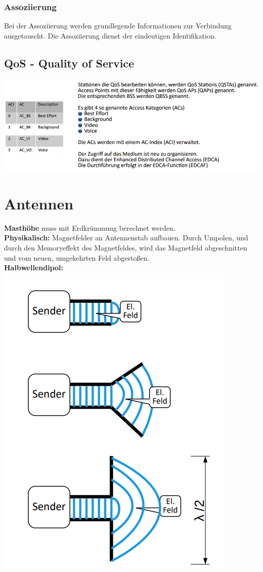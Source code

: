 \documentclass[12pt,a4paper]{article}
\begin{document}
		\subsubsection{Assoziierung}
			Bei der Assoziierung werden grundlegende Informationen zur Verbindung ausgetauscht. Die Assoziierung dienst der eindeutigen Identifikation.
	
	\subsection{QoS - Quality of Service}
	\includegraphics[width=\textwidth]{Bilder/QoS-removedBg.png}

\section{Antennen}
	\textbf{Masthöhe} muss mit Erdkrümmung berechnet werden.\\
	\textbf{Physikalisch:} Magnetfelder an Antennenstab aufbauen. 
	Durch Umpolen, und durch den Memoryeffekt des Magnetfeldes, wird das Magnetfeld abgeschnitten und vom neuen, umgekehrten Feld abgestoßen. \\
	\textbf{Halbwellendipol:}\\
	\includegraphics[scale=0.6]{Bilder/Halbwellendipol.png}\\
	
\end{document}
